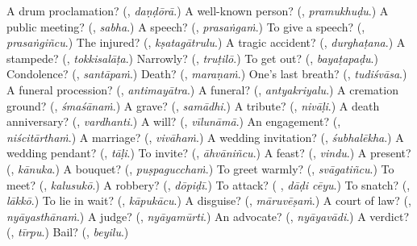 \begin{tcolorbox}[breakable,colback=teal!4,colframe=teal!35!black,title={Before you move on}]
A drum proclamation? (\textbf{}, \emph{daṇḍōrā}.) A well-known person? (\textbf{}, \emph{pramukhuḍu}.) A public meeting? (\textbf{}, \emph{sabha}.) A speech? (\textbf{}, \emph{prasaṅgaṁ}.) To give a speech? (\textbf{}, \emph{prasaṅgiñcu}.) The injured? (\textbf{}, \emph{kṣatagātrulu}.) A tragic accident? (\textbf{}, \emph{durghaṭana}.) A stampede? (\textbf{}, \emph{tokkisalāṭa}.) Narrowly? (\textbf{}, \emph{truṭilō}.) To get out? (\textbf{}, \emph{bayaṭapaḍu}.) Condolence? (\textbf{}, \emph{santāpaṁ}.) Death? (\textbf{}, \emph{maraṇaṁ}.) One's last breath? (\textbf{}, \emph{tudiśvāsa}.) A funeral procession? (\textbf{}, \emph{antimayātra}.) A funeral? (\textbf{}, \emph{antyakriyalu}.) A cremation ground? (\textbf{}, \emph{śmaśānaṁ}.) A grave? (\textbf{}, \emph{samādhi}.) A tribute? (\textbf{}, \emph{nivāḷi}.) A death anniversary? (\textbf{}, \emph{vardhanti}.) A will? (\textbf{}, \emph{vīlunāmā}.) An engagement? (\textbf{}, \emph{niścitārthaṁ}.) A marriage? (\textbf{}, \emph{vivāhaṁ}.) A wedding invitation? (\textbf{}, \emph{śubhalēkha}.) A wedding pendant? (\textbf{}, \emph{tāḷi}.) To invite? (\textbf{}, \emph{āhvāniñcu}.) A feast? (\textbf{}, \emph{vindu}.) A present? (\textbf{}, \emph{kānuka}.) A bouquet? (\textbf{}, \emph{puṣpagucchaṁ}.) To greet warmly? (\textbf{}, \emph{svāgatiñcu}.) To meet? (\textbf{}, \emph{kalusukō}.) A robbery? (\textbf{}, \emph{dōpiḍī}.) To attack? (\textbf{ }, \emph{dāḍi cēyu}.) To snatch? (\textbf{}, \emph{lākkō}.) To lie in wait? (\textbf{}, \emph{kāpukācu}.) A disguise? (\textbf{}, \emph{māruvēṣaṁ}.) A court of law? (\textbf{}, \emph{nyāyasthānaṁ}.) A judge? (\textbf{}, \emph{nyāyamūrti}.) An advocate? (\textbf{}, \emph{nyāyavādi}.) A verdict? (\textbf{}, \emph{tīrpu}.) Bail? (\textbf{}, \emph{beyilu}.)
\end{tcolorbox}
